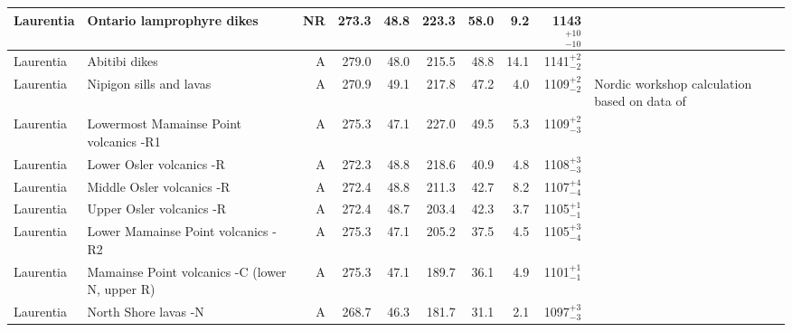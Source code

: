 \begin{longtable}{p{1 in}p{1 in}rrrrrrrp{1.5 in}}
                     Laurentia &                        Ontario lamprophyre dikes &      NR &     273.3 &      48.8 & 223.3 &  58.0 &       9.2 &   1143$^{+10}_{-10}$ &                                 \cite{Piispa2018a} \\ \hline
                     Laurentia &                                    Abitibi dikes &      A &     279.0 &      48.0 & 215.5 &  48.8 &      14.1 &     1141$^{+2}_{-2}$ &                                  \cite{Ernst1993a} \\ \hline
                     Laurentia &                          Nipigon sills and lavas &      A &     270.9 &      49.1 & 217.8 &  47.2 &       4.0 &     1109$^{+2}_{-2}$ &  Nordic workshop calculation based on data of \cite{Palmer1970a, Robertson1971a, Pesonen1979a, Pesonen1979b, Middleton2004a, Borradaile2006a} \\ \hline
                     Laurentia &           Lowermost Mamainse Point volcanics -R1 &      A &     275.3 &      47.1 & 227.0 &  49.5 &       5.3 &     1109$^{+2}_{-3}$ &                         \cite{Swanson-Hysell2014a} \\ \hline
                     Laurentia &                         Lower Osler volcanics -R &      A &     272.3 &      48.8 & 218.6 &  40.9 &       4.8 &     1108$^{+3}_{-3}$ &                         \cite{Swanson-Hysell2014b} \\ \hline
                     Laurentia &                        Middle Osler volcanics -R &      A &     272.4 &      48.8 & 211.3 &  42.7 &       8.2 &     1107$^{+4}_{-4}$ &                         \cite{Swanson-Hysell2014b} \\ \hline
                     Laurentia &                         Upper Osler volcanics -R &      A &     272.4 &      48.7 & 203.4 &  42.3 &       3.7 &     1105$^{+1}_{-1}$ &  \cite{Halls1974a, Swanson-Hysell2014b, Swanson-Hysell2019a} \\ \hline
                     Laurentia &               Lower Mamainse Point volcanics -R2 &      A &     275.3 &      47.1 & 205.2 &  37.5 &       4.5 &     1105$^{+3}_{-4}$ &                         \cite{Swanson-Hysell2014a} \\ \hline
                     Laurentia &   Mamainse Point volcanics -C (lower N, upper R) &      A &     275.3 &      47.1 & 189.7 &  36.1 &       4.9 &     1101$^{+1}_{-1}$ &                         \cite{Swanson-Hysell2014a} \\ \hline
                     Laurentia &                             North Shore lavas -N &      A &     268.7 &      46.3 & 181.7 &  31.1 &       2.1 &     1097$^{+3}_{-3}$ &              \cite{Tauxe2009a,Swanson-Hysell2019a} \\ \hline

\end{longtable}
